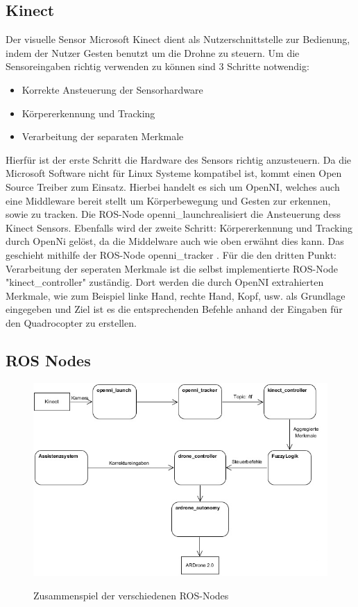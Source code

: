 \newpage
\subsection{Kinect}
Der visuelle Sensor Microsoft Kinect dient als Nutzerschnittstelle zur Bedienung, indem der Nutzer Gesten benutzt um die Drohne zu steuern. Um die Sensoreingaben richtig verwenden zu können sind 3 Schritte notwendig:
\begin{itemize}
	\item Korrekte Ansteuerung der Sensorhardware
	\item Körpererkennung und Tracking
	\item Verarbeitung der separaten Merkmale
\end{itemize}
Hierfür ist der erste Schritt die Hardware des Sensors richtig anzusteuern. Da die Microsoft Software nicht für Linux Systeme kompatibel ist, kommt einen Open Source Treiber zum Einsatz. Hierbei handelt es sich um OpenNI, welches auch eine Middleware bereit stellt um Körperbewegung und Gesten zur erkennen, sowie zu tracken. Die ROS-Node \grqq openni\_launch\grqq realisiert die Ansteuerung dess Kinect Sensors. Ebenfalls wird der zweite Schritt: Körpererkennung und Tracking  durch OpenNi gelöst, da die Middelware auch wie oben erwähnt dies kann. Das geschieht mithilfe der ROS-Node \grqq openni\_tracker \grqq. Für die den dritten Punkt: Verarbeitung der seperaten Merkmale ist die selbst implementierte ROS-Node "kinect\_controller" zuständig. Dort werden die durch OpenNI extrahierten Merkmale, wie zum Beispiel linke Hand, rechte Hand, Kopf, usw. als Grundlage eingegeben und Ziel ist es die entsprechenden Befehle anhand der Eingaben für den Quadrocopter zu erstellen.
\newpage
\subsection{ROS Nodes}
\begin{figure}[ht]
	\centering
	\includegraphics[scale=0.7]{Bilder/ros_nodes_flow.jpg}
	\label{Zusammenspiel der verschiedenen ROS-Nodes}
	\caption{Zusammenspiel der verschiedenen ROS-Nodes}
\end{figure}
\newpage
